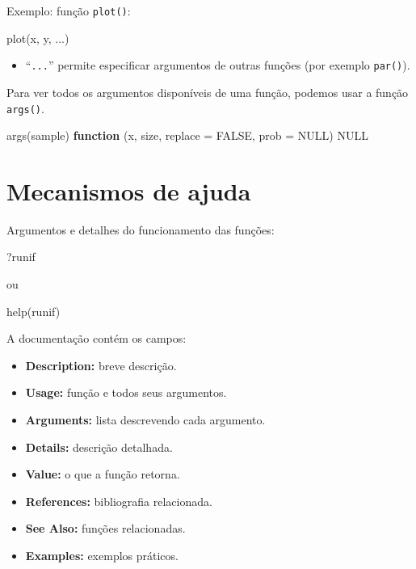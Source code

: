 \documentclass[
  10pt,
  a4paper]{book}
\newenvironment{Shaded}{\begin{snugshade}}{\end{snugshade}}
\newcommand{\AttributeTok}[1]{\textcolor[rgb]{0.77,0.63,0.00}{#1}}
\newcommand{\ConstantTok}[1]{\textcolor[rgb]{0.00,0.00,0.00}{#1}}
\newcommand{\ControlFlowTok}[1]{\textcolor[rgb]{0.13,0.29,0.53}{\textbf{#1}}}
\newcommand{\FunctionTok}[1]{\textcolor[rgb]{0.00,0.00,0.00}{#1}}
\newcommand{\NormalTok}[1]{#1}
\providecommand{\tightlist}{%
  \setlength{\itemsep}{0pt}\setlength{\parskip}{0pt}}
\begin{document}
Exemplo: função \texttt{plot()}:

\begin{Shaded}
\begin{Highlighting}[]
\FunctionTok{plot}\NormalTok{(x, y, ...)}
\end{Highlighting}
\end{Shaded}

\begin{itemize}
\tightlist
\item
  ``\texttt{...}'' permite especificar argumentos de outras funções (por exemplo
  \texttt{par()}).
\end{itemize}

Para ver todos os argumentos disponíveis de uma função, podemos usar a
função \texttt{args()}.

\begin{Shaded}
\begin{Highlighting}[]
\FunctionTok{args}\NormalTok{(sample)}
\ControlFlowTok{function}\NormalTok{ (x, size, }\AttributeTok{replace =} \ConstantTok{FALSE}\NormalTok{, }\AttributeTok{prob =} \ConstantTok{NULL}\NormalTok{) }
\ConstantTok{NULL}
\end{Highlighting}
\end{Shaded}

\hypertarget{mecanismos-de-ajuda}{%
\section{Mecanismos de ajuda}\label{mecanismos-de-ajuda}}

Argumentos e detalhes do funcionamento das funções:

\begin{Shaded}
\begin{Highlighting}[]
\NormalTok{?runif}
\end{Highlighting}
\end{Shaded}

ou

\begin{Shaded}
\begin{Highlighting}[]
\FunctionTok{help}\NormalTok{(runif)}
\end{Highlighting}
\end{Shaded}

A documentação contém os campos:

\begin{itemize}
\tightlist
\item
  \textbf{Description:} breve descrição.
\item
  \textbf{Usage:} função e todos seus argumentos.
\item
  \textbf{Arguments:} lista descrevendo cada argumento.
\item
  \textbf{Details:} descrição detalhada.
\item
  \textbf{Value:} o que a função retorna.
\item
  \textbf{References:} bibliografia relacionada.
\item
  \textbf{See Also:} funções relacionadas.
\item
  \textbf{Examples:} exemplos práticos.
\end{itemize}
\end{document}
